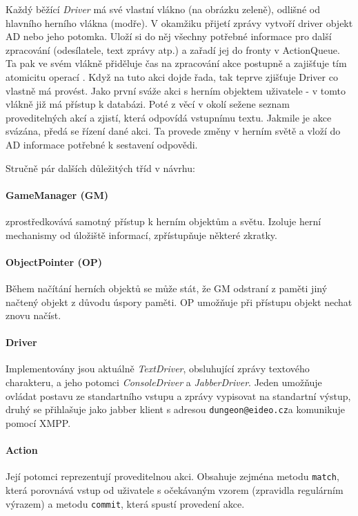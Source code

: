 \documentclass[11pt, a4paper]{article}
\makeatletter
\def\class#1{\emph{#1}}
\def\jid{\texttt{dungeon@eideo.cz}\relax}
\makeatother
\begin{document}
Každý běžící \class{Driver} má své vlastní vlákno (na obrázku zeleně), odlišné od hlavního herního vlákna (modře). V okamžiku přijetí zprávy vytvoří driver objekt AD nebo jeho potomka. Uloží si do něj všechny potřebné informace pro další zpracování (odesílatele, text zprávy atp.) a  zařadí jej do fronty v ActionQueue. Ta pak ve svém vlákně přiděluje čas na zpracování akce postupně a zajišťuje tím atomicitu operací . Když na tuto akci dojde řada, tak teprve zjišťuje Driver co vlastně má provést. Jako první sváže akci s herním objektem uživatele - v tomto vlákně již má přístup k databázi. Poté z věcí v okolí sežene seznam proveditelných akcí a zjistí, která odpovídá vstupnímu textu. Jakmile je akce svázána, předá se řízení dané akci. Ta provede změny v herním světě a vloží do AD informace potřebné k sestavení odpovědi.

Stručně pár dalších důležitých tříd v návrhu:

\paragraph{GameManager (GM)} zprostředkovává samotný přístup k herním objektům a světu. Izoluje herní mechanismy od úložiště informací, zpřístupňuje některé zkratky.

\paragraph{ObjectPointer (OP)} Během načítání herních objektů se může stát, že GM odstraní z paměti jiný načtený objekt z důvodu úspory paměti. OP umožňuje při přístupu objekt nechat znovu načíst.

\paragraph{Driver} Implementovány jsou aktuálně \class{TextDriver}, obsluhující zprávy textového charakteru, a jeho potomci \class{ConsoleDriver} a \class{JabberDriver}. Jeden umožňuje ovládat postavu ze standartního vstupu a zprávy vypisovat na standartní výstup, druhý se přihlašuje jako jabber klient s adresou \jid a komunikuje pomocí XMPP.

\paragraph{Action} Její potomci reprezentují proveditelnou akci. Obsahuje zejména metodu \texttt{match}, která porovnává vstup od uživatele s očekávaným vzorem (zpravidla regulárním výrazem) a metodu \texttt{commit}, která spustí provedení akce.
\end{document}
